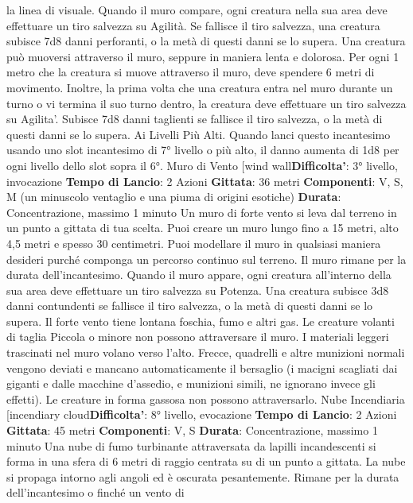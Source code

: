 \begin{multicols}{2}
la linea di visuale.
Quando il muro compare, ogni creatura nella sua area
deve effettuare un tiro salvezza su Agilità. Se
fallisce il tiro salvezza, una creatura subisce 7d8 danni
perforanti, o la metà di questi danni se lo supera.
Una creatura può muoversi attraverso il muro, seppure
in maniera lenta e dolorosa. Per ogni 1 metro che la
creatura si muove attraverso il muro, deve spendere 6
metri di movimento. Inoltre, la prima volta che una
creatura entra nel muro durante un turno o vi termina il
suo turno dentro, la creatura deve effettuare un tiro
salvezza su Agilita'. Subisce 7d8 danni taglienti se
fallisce il tiro salvezza, o la metà di questi danni se lo
supera.
Ai Livelli Più Alti. Quando lanci questo incantesimo
usando uno slot incantesimo di 7° livello o più alto, il
danno aumenta di 1d8 per ogni livello dello slot sopra il
6°.
Muro di Vento
[wind wall\textbf{Difficolta'}:
3° livello, invocazione
\textbf{Tempo di Lancio}: 2 Azioni
\textbf{Gittata}: 36 metri
\textbf{Componenti}: V, S, M (un minuscolo ventaglio e una
piuma di origini esotiche)
\textbf{Durata}: Concentrazione, massimo 1 minuto
Un muro di forte vento si leva dal terreno in un punto a
gittata di tua scelta. Puoi creare un muro lungo fino a 15
metri, alto 4,5 metri e spesso 30 centimetri. Puoi
modellare il muro in qualsiasi maniera desideri purché
componga un percorso continuo sul terreno. Il muro
rimane per la durata dell’incantesimo.
Quando il muro appare, ogni creatura all’interno della
sua area deve effettuare un tiro salvezza su Potenza. Una
creatura subisce 3d8 danni contundenti se fallisce il tiro
salvezza, o la metà di questi danni se lo supera.
Il forte vento tiene lontana foschia, fumo e altri gas. Le
creature volanti di taglia Piccola o minore non possono
attraversare il muro. I materiali leggeri trascinati nel
muro volano verso l’alto. Frecce, quadrelli e altre
munizioni normali vengono deviati e mancano
automaticamente il bersaglio (i macigni scagliati dai
giganti e dalle macchine d’assedio, e munizioni simili,
ne ignorano invece gli effetti). Le creature in forma
gassosa non possono attraversarlo.
Nube Incendiaria
[incendiary cloud\textbf{Difficolta'}:
8° livello, evocazione
\textbf{Tempo di Lancio}: 2 Azioni
\textbf{Gittata}: 45 metri
\textbf{Componenti}: V, S
\textbf{Durata}: Concentrazione, massimo 1 minuto
Una nube di fumo turbinante attraversata da lapilli
incandescenti si forma in una sfera di 6 metri di raggio
centrata su di un punto a gittata. La nube si propaga
intorno agli angoli ed è oscurata pesantemente. Rimane
per la durata dell’incantesimo o finché un vento di

\end{multicols}
